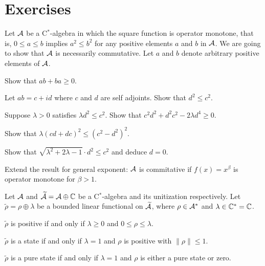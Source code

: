 \documentclass{../../large}
\begin{document}
\begin{prb}
\end{prb}

\begin{prb}
\end{prb}

\begin{prb}
\end{prb}



\section*{Exercises}



\begin{prb}
Let $\mathcal{A}$ be a C$^*$-algebra in which the square function is operator monotone, that is, $0\le a\le b$ implies $a^2\le b^2$ for any positive elements $a$ and $b$ in $\mathcal{A}$.
We are going to show that $\mathcal{A}$ is necessarily commutative.
Let $a$ and $b$ denote arbitrary positive elements of $\mathcal{A}$.
\begin{parts}
\item
Show that $ab+ba\ge0$.
\item
Let $ab=c+id$ where $c$ and $d$ are self adjoints.
Show that $d^2\le c^2$.
\item
Suppose $\lambda>0$ satisfies $\lambda d^2\le c^2$.
Show that $c^2d^2+d^2c^2-2\lambda d^4\ge0$.
\item
Show that $\lambda(cd+dc)^2\le(c^2-d^2)^2$.
\item
Show that $\sqrt{\lambda^2+2\lambda-1}\cdot d^2\le c^2$ and deduce $d=0$.
\item
Extend the result for general exponent: $\mathcal{A}$ is commitative if $f(x)=x^\beta$ is operator monotone for $\beta>1$.
\end{parts}
\end{prb}


\begin{prb}
Let $\mathcal{A}$ and $\widetilde{\mathcal{A}}=\mathcal{A}\oplus\mathbb{C}$ be a C$^*$-algebra and its unitization respectively.
Let $\tilde\rho=\rho\oplus\lambda$ be a bounded linear functional on $\widetilde{\mathcal{A}}$, where $\rho\in\mathcal{A}^*$ and $\lambda\in\mathbb{C}^*=\mathbb{C}$.
\begin{parts}
\item $\tilde\rho$ is positive if and only if $\lambda\ge0$ and $0\le\rho\le\lambda$.
\item $\tilde\rho$ is a state if and only if $\lambda=1$ and $\rho$ is positive with $\|\rho\|\le1$.
\item $\tilde\rho$ is a pure state if and only if $\lambda=1$ and $\rho$ is either a pure state or zero.
\end{parts}
\end{prb}
\end{document}
